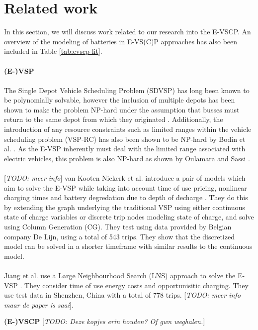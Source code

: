 \documentclass[]{article}
\newcommand{\todo}[1]{{\color{red}[\textit{TODO: #1}]}}
\begin{document}
\section{Related work}
In this section, we will discuss work related to our research into the E-VSCP.  An overview of the modeling of batteries in E-VS(C)P approaches has also been included in Table \ref{tab:evscp-lit}.  \\\\ 
\noindent \textbf{(E-)VSP} \\\\
The Single Depot Vehicle Scheduling Problem (SDVSP) has long been known to be polynomially solvable, however the inclusion of multiple depots has been shown to make the problem NP-hard under the assumption that busses must return to the same depot from which they originated \cite{Bunte2009}. Additionally, the introduction of any resource constraints such as limited ranges within the vehicle scheduling problem (VSP-RC) has also been shown to be NP-hard by Bodin et al. \cite{BODIN198363}. As the E-VSP inherently must deal with the limited range associated with electric vehicles, this problem is also NP-hard as shown by Oulamara and Sassi \cite{Sassi2014}. \\\\
\todo{meer info} van Kooten Niekerk et al. introduce a pair of models which aim to solve the E-VSP while taking into account time of use pricing, nonlinear charging times and battery degredation due to depth of decharge \cite{vanKootenNiekerk2017}. They do this by extending the graph underlying the traditional VSP using either continuous state of charge variables or discrete trip nodes modeling state of charge, and solve using Column Generation (CG). They test using data provided by Belgian company De Lijn, using a total of 543 trips. They show that the discretized model can be solved in a shorter timeframe with similar results to the continuous model. \\\\
Jiang et al. use a Large Neighbourhood Search (LNS) approach to solve the E-VSP \cite{Jiang2021}. They consider time of use energy costs and opportunisitic charging. They use test data in Shenzhen, China with a total of 778 trips. \todo{meer info maar de paper is saai}.


\noindent \textbf{(E-)VSCP} \todo{Deze kopjes erin houden? Of gwn weghalen.} \\
\end{document}
